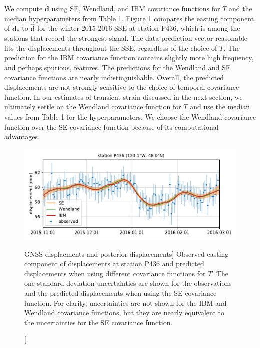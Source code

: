 We compute $\hat{\mathbf{d}}$ using SE, Wendland, and IBM covariance
functions for $T$ and the median hyperparameters from Table 1. Figure
\ref{ch5:fig:Fit} compares the easting component of $\mathbf{d}_*$ to
$\hat{\mathbf{d}}$ for the winter 2015-2016 SSE at station P436, which
is among the stations that record the strongest signal. The data
prediction vector reasonable fits the displacements throughout the
SSE, regardless of the choice of $T$. The prediction for the IBM
covariance function contains slightly more high frequency, and perhaps
spurious, features. The predictions for the Wendland and SE covariance
functions are nearly indistinguishable. Overall, the predicted
displacements are not strongly sensitive to the choice of temporal
covariance function. In our estimates of transient strain discussed in
the next section, we ultimately settle on the Wendland covariance
function for $T$ and use the median values from Table 1 for the
hyperparameters. We choose the Wendland covariance function over the
SE covariance function because of its computational advantages.

\begin{figure}
\includegraphics{ch5/figures/signal_fit/signal-fit.pdf}
\caption
[GNSS displacments and posterior displacements]
{Observed easting component of displacements at station P436
and predicted displacements when using different covariance functions
for $T$. The one standard deviation uncertainties are shown for the
observations and the predicted displacements when using the SE
covariance function. For clarity, uncertainties are not shown for the
IBM and Wendland covariance functions, but they are nearly equivalent
to the uncertainties for the SE covariance function.}
\label{ch5:fig:Fit}
\end{figure}

